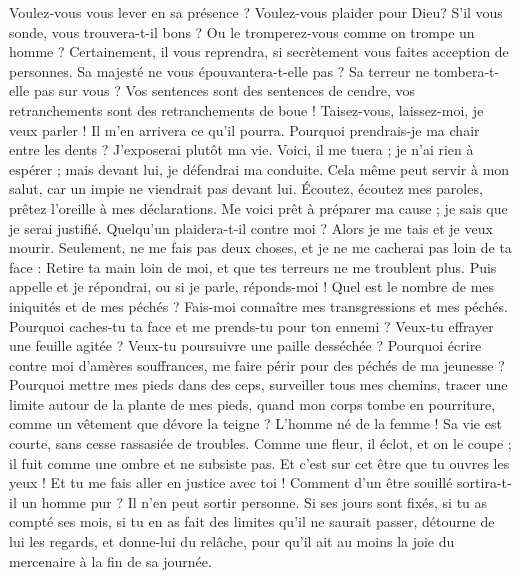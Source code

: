 \begin{multicols}{2}
Voulez-vous vous lever en sa présence ? Voulez-vous plaider pour Dieu?
S'il vous sonde, vous trouvera-t-il bons ? Ou le tromperez-vous comme on trompe un homme ?
Certainement, il vous reprendra, si secrètement vous faites acception de personnes.
Sa majesté ne vous épouvantera-t-elle pas ? Sa terreur ne tombera-t-elle pas sur vous ?
Vos sentences sont des sentences de cendre, vos retranchements sont des retranchements de boue !
Taisez-vous, laissez-moi, je veux parler ! Il m'en arrivera ce qu'il pourra.
Pourquoi prendrais-je ma chair entre les dents ? J'exposerai plutôt ma vie.
Voici, il me tuera ; je n'ai rien à espérer ; mais devant lui, je défendrai ma conduite.
Cela même peut servir à mon salut, car un impie ne viendrait pas devant lui.
Écoutez, écoutez mes paroles, prêtez l'oreille à mes déclarations.
Me voici prêt à préparer ma cause ; je sais que je serai justifié.
Quelqu'un plaidera-t-il contre moi ? Alors je me tais et je veux mourir.
Seulement, ne me fais pas deux choses, et je ne me cacherai pas loin de ta face :
Retire ta main loin de moi, et que tes terreurs ne me troublent plus.
Puis appelle et je répondrai, ou si je parle, réponds-moi !
Quel est le nombre de mes iniquités et de mes péchés ? Fais-moi connaître mes transgressions et mes péchés.
Pourquoi caches-tu ta face et me prends-tu pour ton ennemi ?
Veux-tu effrayer une feuille agitée ? Veux-tu poursuivre une paille desséchée ?
Pourquoi écrire contre moi d'amères souffrances, me faire périr pour des péchés de ma jeunesse ?
Pourquoi mettre mes pieds dans des ceps, surveiller tous mes chemins, tracer une limite autour de la plante de mes pieds,
quand mon corps tombe en pourriture, comme un vêtement que dévore la teigne ?
\VerseOne{}L'homme né de la femme ! Sa vie est courte, sans cesse rassasiée de troubles.
Comme une fleur, il éclot, et on le coupe ; il fuit comme une ombre et ne subsiste pas.
Et c'est sur cet être que tu ouvres les yeux ! Et tu me fais aller en justice avec toi !
Comment d'un être souillé sortira-t-il un homme pur ? Il n'en peut sortir personne.
Si ses jours sont fixés, si tu as compté ses mois, si tu en as fait des limites qu'il ne saurait passer,
détourne de lui les regards, et donne-lui du relâche, pour qu'il ait au moins la joie du mercenaire à la fin de sa journée.

\end{multicols}
